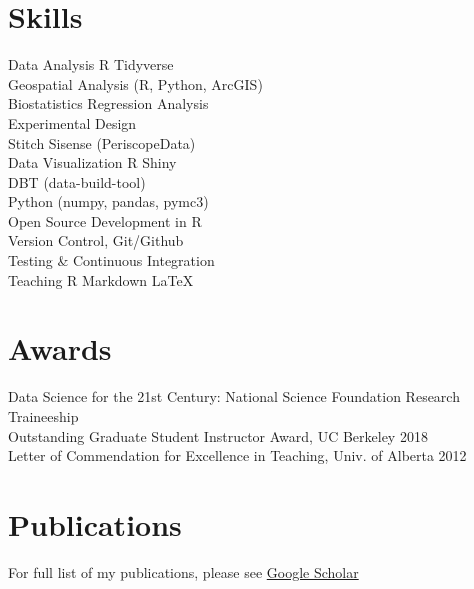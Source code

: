 \documentclass[]{deedy-resume-openfont}
\begin{document}
\begin{minipage}[t]{0.32\textwidth}

\section{Skills}
 \textbullet{} Data Analysis \textbullet{} R \textbullet{} Tidyverse
 \\\textbullet{} Geospatial Analysis (R, Python, ArcGIS) 
 \\\textbullet{} Biostatistics \textbullet{} Regression Analysis 
 \\\textbullet{} Experimental Design 
 \\\textbullet{} Stitch \textbullet{} Sisense (PeriscopeData) 
 \\\textbullet{} Data Visualization  \textbullet{} R Shiny
 \\\textbullet{} DBT (data-build-tool)
 \\\textbullet{} Python (numpy, pandas, pymc3)
 \\\textbullet{} Open Source Development in R 
 \\\textbullet{} Version Control, Git/Github 
 \\\textbullet{} Testing \& Continuous Integration
 \\\textbullet{} Teaching \textbullet{} R Markdown \textbullet{} LaTeX 
\sectionsep


\section{Awards}

\textbullet{} Data Science for the 21st Century: National Science Foundation Research Traineeship \href{http://ds421.berkeley.edu}{\faGlobe} \\
\textbullet{} Outstanding Graduate Student Instructor Award, UC Berkeley 2018\\
\textbullet{} Letter of Commendation for Excellence in Teaching, Univ. of Alberta 2012\\
\sectionsep

\section{Publications}
For full list of my publications, please see \href{https://scholar.google.com/citations?user=0BKLXCUAAAAJ}{Google Scholar \faGraduationCap} 

%
%

\end{minipage} 
\end{document}
